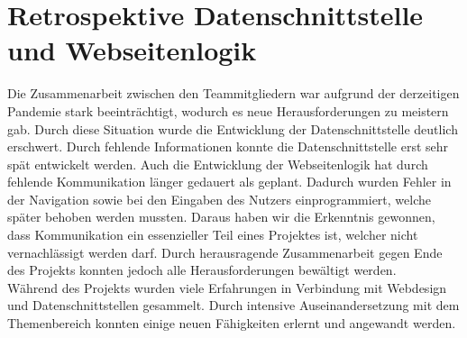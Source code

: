 \section{Retrospektive Datenschnittstelle und Webseitenlogik}
Die Zusammenarbeit zwischen den Teammitgliedern war aufgrund der derzeitigen Pandemie stark beeinträchtigt, wodurch es neue Herausforderungen zu meistern gab. Durch diese Situation wurde die Entwicklung der Datenschnittstelle deutlich erschwert. Durch fehlende Informationen konnte die Datenschnittstelle erst sehr spät entwickelt werden. Auch die Entwicklung der Webseitenlogik hat durch fehlende Kommunikation länger gedauert als geplant. Dadurch wurden Fehler in der Navigation sowie bei den Eingaben des Nutzers einprogrammiert, welche später behoben werden mussten. Daraus haben wir die Erkenntnis gewonnen, dass Kommunikation ein essenzieller Teil eines Projektes ist, welcher nicht vernachlässigt werden darf. Durch herausragende Zusammenarbeit gegen Ende des Projekts konnten jedoch alle Herausforderungen bewältigt werden.\\
Während des Projekts wurden viele Erfahrungen in Verbindung mit Webdesign und Datenschnittstellen gesammelt. Durch intensive Auseinandersetzung mit dem Themenbereich konnten einige neuen Fähigkeiten erlernt und angewandt werden.